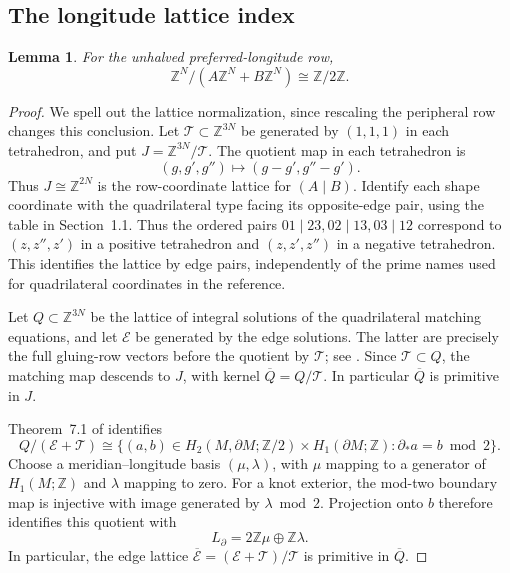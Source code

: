 \documentclass[11pt]{article}
\newtheorem{lemma}[theorem]{Lemma}
\theoremstyle{definition}\newtheorem{definition}[theorem]{Definition}
\theoremstyle{remark}\newtheorem{remark}[theorem]{Remark}
\newcommand{\Z}{\mathbb Z}
\begin{document}
\subsection{The longitude lattice index}

\begin{lemma}\label{lem:longitude-index}
For the unhalved preferred-longitude row,
\begin{equation}
 \Z^N/(A\Z^N+B\Z^N)\cong\Z/2\Z.
 \label{eq:nzcoker}
\end{equation}
\end{lemma}
\begin{proof}
We spell out the lattice normalization, since rescaling the peripheral
row changes this conclusion. Let $\mathscr T\subset\Z^{3N}$ be
generated by $(1,1,1)$ in each tetrahedron, and put
$J=\Z^{3N}/\mathscr T$. The quotient map in each tetrahedron is
\[
 (g,g',g'')\longmapsto(g-g',g''-g').
\]
Thus $J\cong\Z^{2N}$ is the row-coordinate lattice for $(A\mid B)$.
Identify each shape coordinate with the quadrilateral type facing its
opposite-edge pair, using the table in Section~1.1. Thus the ordered
pairs $01\mid23,02\mid13,03\mid12$ correspond to $(z,z'',z')$ in a
positive tetrahedron and $(z,z',z'')$ in a negative tetrahedron. This
identifies the lattice by edge pairs, independently of the prime names
used for quadrilateral coordinates in the reference.

Let $Q\subset\Z^{3N}$ be the lattice of integral solutions of the
quadrilateral matching equations, and let $\mathscr E$ be generated by
the edge solutions. The latter are precisely the full gluing-row vectors
before the quotient by $\mathscr T$; see \cite[Sections 3.1 and
6.2]{GHHHR}. Since $\mathscr T\subset Q$, the matching map descends
to $J$, with kernel $\overline Q=Q/\mathscr T$. In particular
$\overline Q$ is primitive in $J$.

Theorem~7.1 of \cite{GHHHR} identifies
\[
 Q/(\mathscr E+\mathscr T)
 \cong\{(a,b)\in H_2(M,\partial M;\Z/2)
                   \times H_1(\partial M;\Z):
                   \partial_*a=b\bmod2\}.
\]
Choose a meridian--longitude basis $(\mu,\lambda)$, with $\mu$ mapping
to a generator of $H_1(M;\Z)$ and $\lambda$ mapping to zero. For a
knot exterior, the mod-two boundary map is injective with image generated
by $\lambda\bmod2$. Projection onto $b$ therefore identifies this
quotient with
\[
 L_{\partial}=2\Z\mu\oplus\Z\lambda.
\]
In particular, the edge lattice
$\overline{\mathscr E}=(\mathscr E+\mathscr T)/\mathscr T$
is primitive in $\overline Q$.


\end{proof}
\end{document}
